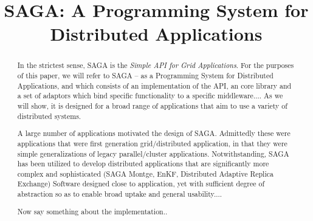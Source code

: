 \documentclass[10pt,letterpaper]{article}
\begin{document}
\title{SAGA: A Programming System for Distributed Applications} 

\begin{abstract}
  
  In the strictest sense, SAGA is the {\it Simple API for Grid Applications}. 
  For the purposes of this paper, we will refer to SAGA -- as a Programming
  System for Distributed Applications, and which consists of an implementation
  of the API, an core library and a set of adaptors which bind specific
  functionality to a specific middleware....
  As we will show, it is designed for a broad range of applications
  that aim to use a variety of distributed systems.
   
  A large number of applications motivated the design of SAGA.
  Admittedly these were applications that were
  first generation grid/distributed application, in that
  they were simple generalizations of legacy parallel/cluster
  applications.
  Notwithstanding, SAGA has been utilized to develop distributed
  applications that are significantly more complex and sophisticated
  (SAGA Montge, EnKF, Distributed Adaptive Replica Exchange)
  Software designed close to application, yet with sufficient
  degree of abstraction so as to enable broad uptake and general
  usability....
  

  Now say something about the implementation..
\end{abstract}

\maketitle
\end{document}
